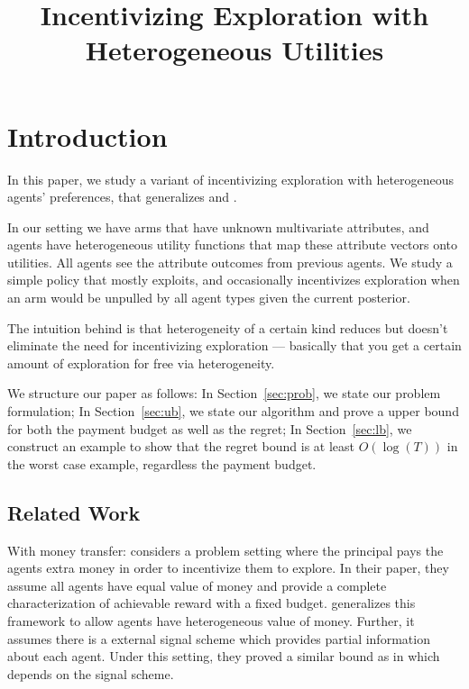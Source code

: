 \documentclass{article}
\title{Incentivizing Exploration with Heterogeneous Utilities}
\begin{document}
\maketitle


\section{Introduction}
In this paper, we study a variant of incentivizing exploration with heterogeneous agents' preferences, that generalizes \cite{frazier2014incentivizing} and \cite{han2015incentivizing}. 

In our setting we have arms that have unknown multivariate attributes, and agents have heterogeneous utility functions that map these attribute vectors onto utilities. All agents see the attribute outcomes from previous agents. We study a simple policy that mostly exploits, and occasionally incentivizes exploration when an arm would be unpulled by all agent types given the current posterior.  

The intuition behind is that heterogeneity of a certain kind reduces but doesn't eliminate the need for incentivizing exploration --- basically that you get a certain amount of exploration for free via heterogeneity.

We structure our paper as follows: In Section~\ref{sec:prob}, we state our problem formulation; In Section~\ref{sec:ub}, we state our algorithm and prove a upper bound for both the payment budget as well as the regret; In Section~\ref{sec:lb}, we construct an example to show that the regret bound is at least $O(\log(T))$ in the worst case example, regardless the payment budget.



\subsection{Related Work}

With money transfer: \cite{frazier2014incentivizing} considers a problem setting where the principal pays the agents extra money in order to incentivize them to explore. In their paper, they assume all agents have equal value of money and provide a complete characterization of achievable reward with a fixed budget. \cite{han2015incentivizing} generalizes this framework to allow agents have heterogeneous value of money. Further, it assumes there is a external signal scheme which provides partial information about each agent. Under this setting, they proved a similar bound as in \cite{frazier2014incentivizing} which depends on the signal scheme.
\end{document}
